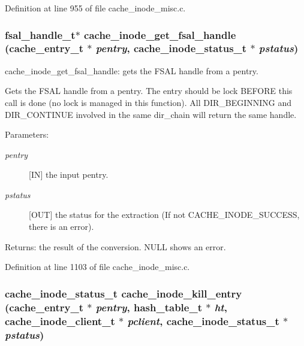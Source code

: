 Definition at line 955 of file cache\_\-inode\_\-misc.c.
\subsubsection[{cache\_\-inode\_\-get\_\-fsal\_\-handle}]{\setlength{\rightskip}{0pt plus 5cm}fsal\_\-handle\_\-t$\ast$ cache\_\-inode\_\-get\_\-fsal\_\-handle (cache\_\-entry\_\-t $\ast$ {\em pentry}, \/  cache\_\-inode\_\-status\_\-t $\ast$ {\em pstatus})}\label{cache__inode__misc_8c_625ee0acb63c4e7f1b342389c5dd7a0b}


cache\_\-inode\_\-get\_\-fsal\_\-handle: gets the FSAL handle from a pentry.

Gets the FSAL handle from a pentry. The entry should be lock BEFORE this call is done (no lock is managed in this function). All DIR\_\-BEGINNING and DIR\_\-CONTINUE involved in the same dir\_\-chain will return the same handle.

\begin{Desc}
\item[Parameters:]
\begin{description}
\item[{\em pentry}][IN] the input pentry. \item[{\em pstatus}][OUT] the status for the extraction (If not CACHE\_\-INODE\_\-SUCCESS, there is an error).\end{description}
\end{Desc}
\begin{Desc}
\item[Returns:]the result of the conversion. NULL shows an error. \end{Desc}


Definition at line 1103 of file cache\_\-inode\_\-misc.c.
\subsubsection[{cache\_\-inode\_\-kill\_\-entry}]{\setlength{\rightskip}{0pt plus 5cm}cache\_\-inode\_\-status\_\-t cache\_\-inode\_\-kill\_\-entry (cache\_\-entry\_\-t $\ast$ {\em pentry}, \/  hash\_\-table\_\-t $\ast$ {\em ht}, \/  cache\_\-inode\_\-client\_\-t $\ast$ {\em pclient}, \/  cache\_\-inode\_\-status\_\-t $\ast$ {\em pstatus})}\label{cache__inode__misc_8c_ed59b090dbed68c7eca3a1b5514a11c5}


